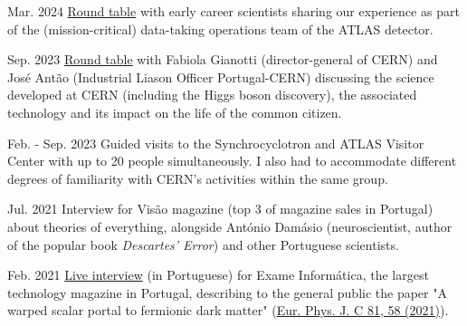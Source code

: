 
\begin{cventries}
    
    {}{Mar. 2024}
    {\href{https://indico.cern.ch/event/1378416/overview}{Round table} with early career scientists sharing our experience as part of the (mission-critical) data-taking operations team of the ATLAS detector.}



    {}{Sep. 2023}
    {\href{https://www.cienciaviva.pt/divulgacao-cientifica/o-bosao-de-higgs-e-as-nossas-vidas}{Round table} with Fabiola Gianotti (director-general of CERN) and José Antão (Industrial Liason Officer Portugal-CERN) discussing the science developed at CERN (including the Higgs boson discovery), the associated technology and its impact on the life of the common citizen.}

    {}{Feb. - Sep. 2023}
    {Guided visits to the Synchrocyclotron and ATLAS Visitor Center with up to 20 people simultaneously. I also had to accommodate different degrees of familiarity with CERN's activities within the same group.}

    {}{Jul. 2021}
    {Interview for Visão magazine (top 3 of magazine sales in Portugal) about theories of everything, alongside António Damásio (neuroscientist, author of the popular book \textit{Descartes' Error}) and other Portuguese scientists.}


    {}{Feb. 2021}
    {\href{https://visao.pt/exameinformatica/videos-ei/eilive/2021-02-08-cromo-da-semana-novas-particulas-atomicas-e-a-quinta-dimensao/}{Live interview} (in Portuguese) for Exame Informática, the largest technology magazine in Portugal, describing to the general public the paper "A warped scalar portal to fermionic dark matter" (\href{https://doi.org/10.1140/epjc/s10052-021-08851-0}{Eur. Phys. J. C 81, 58 (2021)}). }


\end{cventries}
